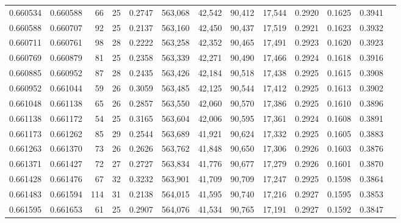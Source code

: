 \begin{tabular}{rrrrrrrrrrrrr}
0.660534 & 0.660588 &  66 &  25 &                                     0.2747 & 563,068 &  42,542 &  90,412 &  17,544 & 0.2920 & 0.1625 & 0.3941 \\
0.660588 & 0.660707 &  92 &  25 &                                     0.2137 & 563,160 &  42,450 &  90,437 &  17,519 & 0.2921 & 0.1623 & 0.3932 \\
0.660711 & 0.660761 &  98 &  28 &                                     0.2222 & 563,258 &  42,352 &  90,465 &  17,491 & 0.2923 & 0.1620 & 0.3923 \\
0.660769 & 0.660879 &  81 &  25 &                                     0.2358 & 563,339 &  42,271 &  90,490 &  17,466 & 0.2924 & 0.1618 & 0.3916 \\
0.660885 & 0.660952 &  87 &  28 &                                     0.2435 & 563,426 &  42,184 &  90,518 &  17,438 & 0.2925 & 0.1615 & 0.3908 \\
0.660952 & 0.661044 &  59 &  26 &                                     0.3059 & 563,485 &  42,125 &  90,544 &  17,412 & 0.2925 & 0.1613 & 0.3902 \\
0.661048 & 0.661138 &  65 &  26 &                                     0.2857 & 563,550 &  42,060 &  90,570 &  17,386 & 0.2925 & 0.1610 & 0.3896 \\
0.661138 & 0.661172 &  54 &  25 &                                     0.3165 & 563,604 &  42,006 &  90,595 &  17,361 & 0.2924 & 0.1608 & 0.3891 \\
0.661173 & 0.661262 &  85 &  29 &                                     0.2544 & 563,689 &  41,921 &  90,624 &  17,332 & 0.2925 & 0.1605 & 0.3883 \\
0.661263 & 0.661370 &  73 &  26 &                                     0.2626 & 563,762 &  41,848 &  90,650 &  17,306 & 0.2926 & 0.1603 & 0.3876 \\
0.661371 & 0.661427 &  72 &  27 &                                     0.2727 & 563,834 &  41,776 &  90,677 &  17,279 & 0.2926 & 0.1601 & 0.3870 \\
0.661428 & 0.661476 &  67 &  32 &                                     0.3232 & 563,901 &  41,709 &  90,709 &  17,247 & 0.2925 & 0.1598 & 0.3864 \\
0.661483 & 0.661594 & 114 &  31 &                                     0.2138 & 564,015 &  41,595 &  90,740 &  17,216 & 0.2927 & 0.1595 & 0.3853 \\
0.661595 & 0.661653 &  61 &  25 &                                     0.2907 & 564,076 &  41,534 &  90,765 &  17,191 & 0.2927 & 0.1592 & 0.3847 \\

\end{tabular}
